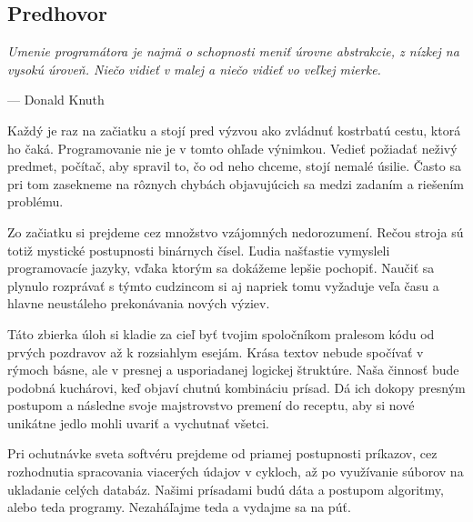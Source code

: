 \subsection{Predhovor}
\setlength\epigraphwidth{13cm}
\setlength\epigraphrule{0pt}
\epigraph{\small\itshape Umenie programátora je najmä o schopnosti meniť úrovne abstrakcie, z nízkej na vysokú úroveň. Niečo vidieť v malej a niečo vidieť vo veľkej mierke.}{--- \textup{Donald Knuth}}

Každý je raz na začiatku a stojí pred výzvou ako zvládnuť kostrbatú cestu, ktorá ho čaká.  Programovanie nie je v tomto ohľade výnimkou. Vedieť požiadať neživý predmet, počítač, aby  spravil to, čo od neho chceme, stojí nemalé úsilie. Často sa pri tom zasekneme na rôznych  chybách objavujúcich sa medzi zadaním a riešením problému. 

Zo začiatku si prejdeme cez množstvo vzájomných nedorozumení. Rečou stroja sú totiž mystické  postupnosti binárnych čísel. Ľudia našťastie vymysleli programovacíe jazyky, vďaka ktorým sa  dokážeme lepšie pochopiť. Naučiť sa plynulo rozprávať s týmto cudzincom si aj napriek tomu  vyžaduje veľa času a hlavne neustáleho prekonávania nových výziev.

Táto zbierka úloh si kladie za cieľ byť tvojim spoločníkom pralesom kódu od prvých pozdravov až k rozsiahlym esejám. Krása textov nebude spočívať v rýmoch básne, ale v presnej a usporiadanej logickej štruktúre. Naša činnosť bude podobná kuchárovi, keď objaví chutnú kombináciu prísad. Dá ich dokopy presným postupom a následne svoje majstrovstvo premení do receptu, aby si nové unikátne jedlo mohli uvariť a vychutnať všetci.

Pri ochutnávke sveta softvéru prejdeme od priamej postupnosti príkazov, cez rozhodnutia spracovania viacerých údajov v cykloch, až po využívanie súborov na ukladanie celých databáz. Našimi prísadami budú dáta a postupom algoritmy, alebo teda programy. Nezaháľajme teda a vydajme sa na púť. 

